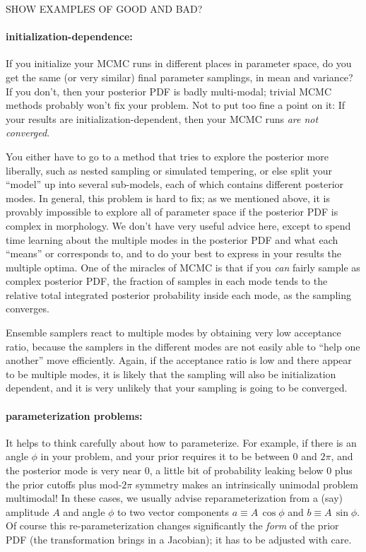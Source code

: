 \documentclass[12pt,twoside,pdftex]{article}
\begin{document}
SHOW EXAMPLES OF GOOD AND BAD?

\paragraph{initialization-dependence:}
If you initialize your MCMC runs in different places in parameter space,
  do you get the same (or very similar) final parameter samplings,
  in mean and variance?
If you don't,
  then your posterior PDF is badly multi-modal;
  trivial MCMC methods probably won't fix your problem.
Not to put too fine a point on it:
If your results are initialization-dependent,
  then your MCMC runs \emph{are not converged}.

You either have to go to a method that tries to explore the posterior
  more liberally, such as nested sampling or simulated tempering,
  or else split your ``model'' up into several sub-models,
  each of which contains different posterior modes.
In general, this problem is hard to fix;
  as we mentioned above, it is provably impossible
  to explore all of parameter space if the posterior PDF is
  complex in morphology.
We don't have very useful advice here, except to
  spend time learning about the multiple modes in the posterior PDF
  and what each ``means'' or corresponds to,
  and to do your best to express in your results the multiple optima.
One of the miracles of MCMC is that if you \emph{can} fairly sample
  as complex posterior PDF,
  the fraction of samples in each mode
  tends to the relative total integrated posterior probability inside each mode,
  as the sampling converges.

Ensemble samplers react to multiple modes
  by obtaining very low acceptance ratio,
  because the samplers in the different modes are not easily able to ``help one another''
  move efficiently.
Again, if the acceptance ratio is low and there appear to be multiple modes,
  it is likely that the sampling will also be initialization dependent,
  and it is very unlikely that your sampling is going to be converged.

\paragraph{parameterization problems:}
It helps to think carefully about how to parameterize.
For example, if there is an angle $\phi$ in your problem,
  and your prior requires it to be between $0$ and $2\pi$,
  and the posterior mode is very near $0$,
  a little bit of probability leaking below $0$ plus the prior cutoffs plus mod-$2\pi$ symmetry
  makes an intrinsically unimodal problem multimodal!
In these cases, we usually advise reparameterization from a (say) amplitude $A$ and angle $\phi$
  to two vector components $a\equiv A\,\cos\phi$ and $b\equiv A\,\sin\phi$.
Of course this re-parameterization changes significantly the \emph{form} of the prior PDF
  (the transformation brings in a Jacobian);
  it has to be adjusted with care.
\end{document}
